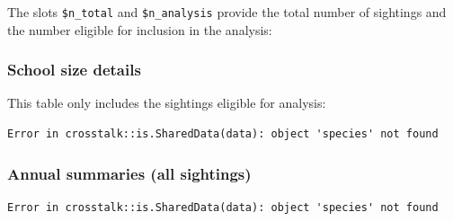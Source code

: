 \documentclass[
]{book}
\newenvironment{Shaded}{\begin{snugshade}}{\end{snugshade}}
\newcommand{\ControlFlowTok}[1]{\textcolor[rgb]{0.13,0.29,0.53}{\textbf{#1}}}
\newcommand{\KeywordTok}[1]{\textcolor[rgb]{0.13,0.29,0.53}{\textbf{#1}}}
\newcommand{\NormalTok}[1]{#1}
\newcommand{\OperatorTok}[1]{\textcolor[rgb]{0.81,0.36,0.00}{\textbf{#1}}}
\newcommand{\StringTok}[1]{\textcolor[rgb]{0.31,0.60,0.02}{#1}}
\begin{document}
\begin{Shaded}
\end{Shaded}

The slots \texttt{\$n\_total} and \texttt{\$n\_analysis} provide the total number of sightings and the number eligible for inclusion in the analysis:

\begin{Shaded}
\end{Shaded}

\hypertarget{school-size-details}{%
\subsubsection*{School size details}\label{school-size-details}}

This table only includes the sightings eligible for analysis:

\begin{verbatim}
Error in crosstalk::is.SharedData(data): object 'species' not found
\end{verbatim}

\hypertarget{annual-summaries-all-sightings}{%
\subsubsection*{Annual summaries (all sightings)}\label{annual-summaries-all-sightings}}

\begin{verbatim}
Error in crosstalk::is.SharedData(data): object 'species' not found
\end{verbatim}
\end{document}

